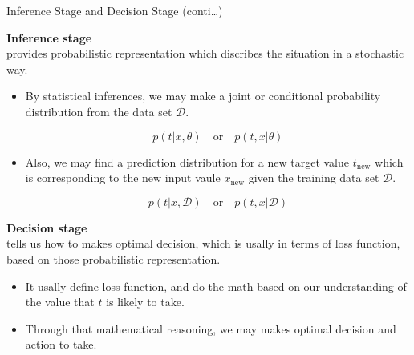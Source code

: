 \documentclass{bredelebeamer}
\begin{document}
\begin{frame}{Inference Stage and Decision Stage (conti\ldots)}
  \begin{justify}
    \textbf{Inference stage}\\
    provides probabilistic representation which discribes the situation in a
    stochastic way.
    \begin{itemize}
      \item\begin{justify}
        By statistical inferences, we may make a joint or conditional
        probability distribution from the data set $\mathcal{D}$.
      \end{justify}
      \begin{equation}
        p(t|x, \theta) \quad \textrm{or} \quad p(t,x | \theta)
      \end{equation}
      \item\begin{justify}
        Also, we may find a prediction distribution for a new target value
        $t_{\mathrm{new}}$ which is corresponding to the new input vaule
        $x_{\mathrm{new}}$ given the training data set $\mathcal{D}$.
      \end{justify}
      \begin{equation}
        p(t|x, \mathcal{D}) \quad \textrm{or} \quad p(t,x | \mathcal{D})
      \end{equation}
    \end{itemize}

    \vspace{0.5\baselineskip}
    \textbf{Decision stage}\\
    tells us how to makes optimal decision, which is usally in terms of loss
    function, based on those probabilistic representation.
    \begin{itemize}
      \item\begin{justify}
        It usally define loss function, and do the math based on our
        understanding of the value that $t$ is likely to take.
      \end{justify}
      \item\begin{justify}
        Through that mathematical reasoning, we may makes optimal decision
        and action to take.
      \end{justify}
    \end{itemize}
  \end{justify}
\end{frame}
\end{document}
